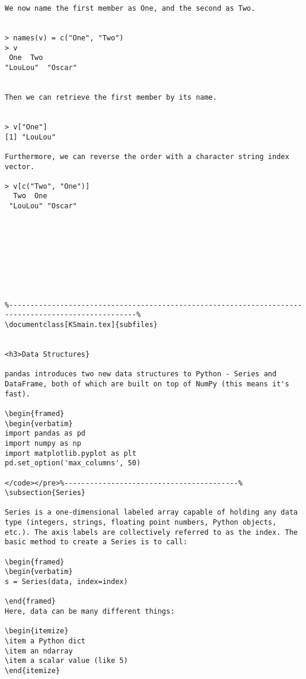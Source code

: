 \begin{itemize}
\begin{framed}
\begin{verbatim}
We now name the first member as One, and the second as Two.


> names(v) = c("One", "Two") 
> v 
 One  Two 
"LouLou"  "Oscar"


Then we can retrieve the first member by its name.


> v["One"] 
[1] "LouLou"

Furthermore, we can reverse the order with a character string index vector.

> v[c("Two", "One")] 
  Two  One 
 "LouLou" "Oscar"









%----------------------------------------------------------------------------------------------------%
\documentclass[KSmain.tex]{subfiles} 
 

<h3>Data Structures}

pandas introduces two new data structures to Python - Series and DataFrame, both of which are built on top of NumPy (this means it's fast).

\begin{framed}
\begin{verbatim}
import pandas as pd
import numpy as np
import matplotlib.pyplot as plt
pd.set_option('max_columns', 50)

</code></pre>%-----------------------------------------%
\subsection{Series}

Series is a one-dimensional labeled array capable of holding any data type (integers, strings, floating point numbers, Python objects, etc.). The axis labels are collectively referred to as the index. The basic method to create a Series is to call:
 
\begin{framed}
\begin{verbatim}
s = Series(data, index=index)

\end{framed} 
Here, data can be many different things:
 
\begin{itemize}
\item a Python dict
\item an ndarray
\item a scalar value (like 5)
\end{itemize}


\end{verbatim}
\end{framed}
\end{itemize}
